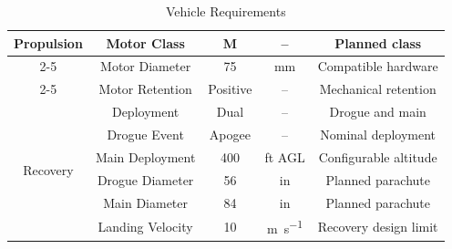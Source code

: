\begin{table}[H]
\begin{tabular}{ccccc}

    \multirow{3}{*}{Propulsion}
        & Motor Class
        & M
        & --
        & Planned class \\
    \cmidrule(lr){2-5}

        & Motor Diameter
        & 75
        & \unit{mm}
        & Compatible hardware \\
    \cmidrule(lr){2-5}

        & Motor Retention
        & Positive
        & --
        & Mechanical retention \\
    \midrule


    \multirow{6}{*}{Recovery}
        & Deployment
        & Dual
        & --
        & Drogue and main \\
    \cmidrule(lr){2-5}

        & Drogue Event
        & Apogee
        & --
        & Nominal deployment \\
    \cmidrule(lr){2-5}

        & Main Deployment
        & 400
        & ft AGL
        & Configurable altitude \\
    \cmidrule(lr){2-5}

        & Drogue Diameter
        & 56
        & \unit{in}
        & Planned parachute \\
    \cmidrule(lr){2-5}

        & Main Diameter
        & 84
        & \unit{in}
        & Planned parachute \\
    \cmidrule(lr){2-5}

        & Landing Velocity
        & 10
        & \unit{\meter\per\second}
        & Recovery design limit \\

    \bottomrule
    \end{tabular}
    \vspace{3mm}
    \caption{\ares{} Vehicle Requirements}
    \label{tab:ARES_Requirements_Table}
\end{table}



